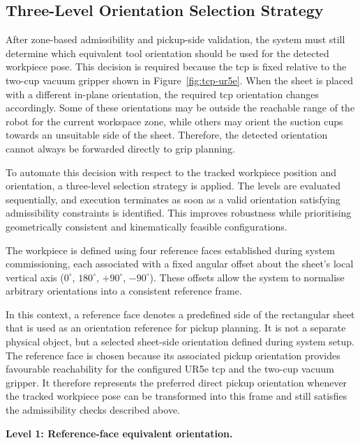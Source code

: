 \subsection{Three-Level Orientation Selection Strategy}
\label{sec:three-level-orientation-selection-strategy}

After zone-based admissibility and pickup-side validation, the system must still determine which equivalent tool orientation should be used for the detected workpiece pose. This decision is required because the \ac{tcp} is fixed relative to the two-cup vacuum gripper shown in Figure~\ref{fig:tcp-ur5e}. When the sheet is placed with a different in-plane orientation, the required \ac{tcp} orientation changes accordingly. Some of these orientations may be outside the reachable range of the robot for the current workspace zone, while others may orient the suction cups towards an unsuitable side of the sheet. Therefore, the detected orientation cannot always be forwarded directly to grip planning.

To automate this decision with respect to the tracked workpiece position and orientation, a three-level selection strategy is applied. The levels are evaluated sequentially, and execution terminates as soon as a valid orientation satisfying admissibility constraints is identified. This improves robustness while prioritising geometrically consistent and kinematically feasible configurations.

The workpiece is defined using four reference faces established during system commissioning, each associated with a fixed angular offset about the sheet's local vertical axis ($0^\circ$, $180^\circ$, $+90^\circ$, $-90^\circ$). These offsets allow the system to normalise arbitrary orientations into a consistent reference frame.

In this context, a reference face denotes a predefined side of the rectangular sheet that is used as an orientation reference for pickup planning. It is not a separate physical object, but a selected sheet-side orientation defined during system setup. The reference face is chosen because its associated pickup orientation provides favourable reachability for the configured UR5e \ac{tcp} and the two-cup vacuum gripper. It therefore represents the preferred direct pickup orientation whenever the tracked workpiece pose can be transformed into this frame and still satisfies the admissibility checks described above.

\noindent\textbf{Level 1: Reference-face equivalent orientation.}

